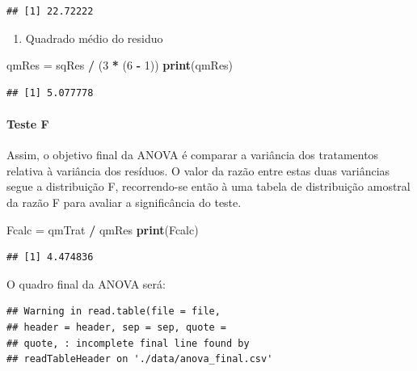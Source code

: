 \documentclass[
]{article}
\newenvironment{Shaded}{\begin{snugshade}}{\end{snugshade}}
\newcommand{\DecValTok}[1]{\textcolor[rgb]{0.00,0.00,0.81}{#1}}
\newcommand{\KeywordTok}[1]{\textcolor[rgb]{0.13,0.29,0.53}{\textbf{#1}}}
\newcommand{\NormalTok}[1]{#1}
\newcommand{\OperatorTok}[1]{\textcolor[rgb]{0.81,0.36,0.00}{\textbf{#1}}}
\newcommand{\StringTok}[1]{\textcolor[rgb]{0.31,0.60,0.02}{#1}}
\providecommand{\tightlist}{%
  \setlength{\itemsep}{0pt}\setlength{\parskip}{0pt}}
\begin{document}
\begin{verbatim}
## [1] 22.72222
\end{verbatim}

\begin{enumerate}
\def\labelenumi{\arabic{enumi}.}
\setcounter{enumi}{1}
\tightlist
\item
  Quadrado médio do residuo
\end{enumerate}

\begin{Shaded}
\begin{Highlighting}[]
\NormalTok{qmRes =}\StringTok{ }\NormalTok{sqRes }\OperatorTok{/}\StringTok{ }\NormalTok{(}\DecValTok{3} \OperatorTok{*}\StringTok{ }\NormalTok{(}\DecValTok{6} \OperatorTok{-}\StringTok{ }\DecValTok{1}\NormalTok{))}
\KeywordTok{print}\NormalTok{(qmRes)}
\end{Highlighting}
\end{Shaded}

\begin{verbatim}
## [1] 5.077778
\end{verbatim}

\hypertarget{teste-f}{%
\paragraph{Teste F}\label{teste-f}}

Assim, o objetivo final da ANOVA é comparar a variância dos tratamentos relativa à variância dos resíduos. O valor da razão entre estas duas variâncias segue a distribuição F, recorrendo-se então à uma tabela de distribuição amostral da razão F para avaliar a significância do teste.

\begin{Shaded}
\begin{Highlighting}[]
\NormalTok{Fcalc =}\StringTok{ }\NormalTok{qmTrat }\OperatorTok{/}\StringTok{ }\NormalTok{qmRes}
\KeywordTok{print}\NormalTok{(Fcalc)}
\end{Highlighting}
\end{Shaded}

\begin{verbatim}
## [1] 4.474836
\end{verbatim}

O quadro final da ANOVA será:

\begin{verbatim}
## Warning in read.table(file = file,
## header = header, sep = sep, quote =
## quote, : incomplete final line found by
## readTableHeader on './data/anova_final.csv'
\end{verbatim}
\end{document}

